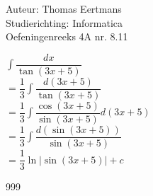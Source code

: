 \documentclass[a4paper]{article}
\begin{document}
  
\noindent \large Auteur: Thomas Eertmans \\
\noindent \large Studierichting: Informatica\\
\noindent \large Oefeningenreeks 4A nr. 8.11\\

\medskip

\normalsize

$\displaystyle\int \dfrac{dx}{\tan(3x+5)}$ \\

$= \dfrac{1}{3} \displaystyle\int \dfrac{d(3x+5)}{\tan(3x+5)}$ \\

$= \dfrac{1}{3} \displaystyle\int \dfrac{\cos(3x+5)}{\sin(3x+5)} d(3x+5)$ \\

$= \dfrac{1}{3} \displaystyle\int \dfrac{d(\sin(3x+5))}{\sin(3x+5)}$ \\

$= \dfrac{1}{3} \ln |\sin(3x+5)| + c$

\begin{thebibliography}{999}
\end{thebibliography}
\end{document}
